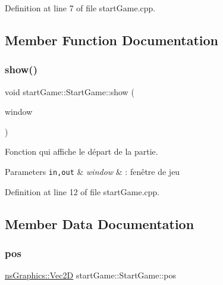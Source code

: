 Definition at line 7 of file start\+Game.\+cpp.



\subsection{Member Function Documentation}
\mbox{\label{structstart_game_1_1_start_game_a5607dba94483e55cc1855192063e4a58}} 
\subsubsection{\texorpdfstring{show()}{show()}}
{\footnotesize\ttfamily void start\+Game\+::\+Start\+Game\+::show (\begin{DoxyParamCaption}\item[{\hyperlink{class_min_g_l}{Min\+GL} \&}]{window }\end{DoxyParamCaption})}



Fonction qui affiche le départ de la partie. 


\begin{DoxyParams}[1]{Parameters}
\mbox{\tt in,out}  & {\em window} & \+: fenêtre de jeu \\
\hline
\end{DoxyParams}


Definition at line 12 of file start\+Game.\+cpp.



\subsection{Member Data Documentation}
\mbox{\label{structstart_game_1_1_start_game_a5eca1a21b445f45875bf9a5116a97a5e}} 
\subsubsection{\texorpdfstring{pos}{pos}}
{\footnotesize\ttfamily \hyperlink{classns_graphics_1_1_vec2_d}{ns\+Graphics\+::\+Vec2D} start\+Game\+::\+Start\+Game\+::pos}



